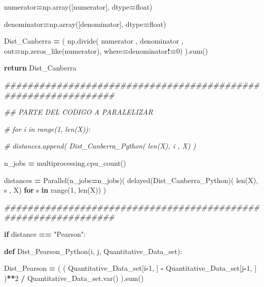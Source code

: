 \documentclass[
  11pt,
  a4paper,
]{article}
\newenvironment{Shaded}{\begin{snugshade}}{\end{snugshade}}
\newcommand{\BuiltInTok}[1]{#1}
\newcommand{\CommentTok}[1]{\textcolor[rgb]{0.56,0.35,0.01}{\textit{#1}}}
\newcommand{\ControlFlowTok}[1]{\textcolor[rgb]{0.13,0.29,0.53}{\textbf{#1}}}
\newcommand{\DecValTok}[1]{\textcolor[rgb]{0.00,0.00,0.81}{#1}}
\newcommand{\KeywordTok}[1]{\textcolor[rgb]{0.13,0.29,0.53}{\textbf{#1}}}
\newcommand{\NormalTok}[1]{#1}
\newcommand{\OperatorTok}[1]{\textcolor[rgb]{0.81,0.36,0.00}{\textbf{#1}}}
\newcommand{\StringTok}[1]{\textcolor[rgb]{0.31,0.60,0.02}{#1}}
\begin{document}
\begin{Shaded}
\begin{Highlighting}[]
\NormalTok{            numerator}\OperatorTok{=}\NormalTok{np.array([numerator], dtype}\OperatorTok{=}\BuiltInTok{float}\NormalTok{)}

\NormalTok{            denominator}\OperatorTok{=}\NormalTok{np.array([denominator], dtype}\OperatorTok{=}\BuiltInTok{float}\NormalTok{)}

\NormalTok{            Dist\_Canberra }\OperatorTok{=}\NormalTok{ ( np.divide( numerator , denominator , out}\OperatorTok{=}\NormalTok{np.zeros\_like(numerator), where}\OperatorTok{=}\NormalTok{denominator}\OperatorTok{!=}\DecValTok{0}\NormalTok{) ).}\BuiltInTok{sum}\NormalTok{()}

            \ControlFlowTok{return}\NormalTok{ Dist\_Canberra}

\CommentTok{\#\#\#\#\#\#\#\#\#\#\#\#\#\#\#\#\#\#\#\#\#\#\#\#\#\#\#\#\#\#\#\#\#\#\#\#\#\#\#\#\#\#\#\#\#\#\#\#\#\#\#\#\#\#\#\#\#\#\#\#\#\#\#}

        \CommentTok{\#\# PARTE DEL CODIGO A PARALELIZAR}

        \CommentTok{\# for i in range(1, len(X)):}

          \CommentTok{\#  distances.append( Dist\_Canberra\_Python( len(X), i , X) )}

\NormalTok{        n\_jobs  }\OperatorTok{=}\NormalTok{ multiprocessing.cpu\_count()}

\NormalTok{        distances }\OperatorTok{=}\NormalTok{ Parallel(n\_jobs}\OperatorTok{=}\NormalTok{n\_jobs)( delayed(Dist\_Canberra\_Python)( }\BuiltInTok{len}\NormalTok{(X), s , X) }\ControlFlowTok{for}\NormalTok{ s }\KeywordTok{in} \BuiltInTok{range}\NormalTok{(}\DecValTok{1}\NormalTok{, }\BuiltInTok{len}\NormalTok{(X)) )}
                

\CommentTok{\#\#\#\#\#\#\#\#\#\#\#\#\#\#\#\#\#\#\#\#\#\#\#\#\#\#\#\#\#\#\#\#\#\#\#\#\#\#\#\#\#\#\#\#\#\#\#\#\#\#\#\#\#\#\#\#\#\#\#\#\#\#\#}
   
    \ControlFlowTok{if}\NormalTok{ distance }\OperatorTok{==} \StringTok{"Pearson"}\NormalTok{:}

        \KeywordTok{def}\NormalTok{ Dist\_Pearson\_Python(i, j, Quantitative\_Data\_set):}

\NormalTok{            Dist\_Pearson }\OperatorTok{=}\NormalTok{ ( ( Quantitative\_Data\_set[i}\OperatorTok{{-}}\DecValTok{1}\NormalTok{, ] }\OperatorTok{{-}}\NormalTok{ Quantitative\_Data\_set[j}\OperatorTok{{-}}\DecValTok{1}\NormalTok{, ] )}\OperatorTok{**}\DecValTok{2} \OperatorTok{/}\NormalTok{ Quantitative\_Data\_set.var() ).}\BuiltInTok{sum}\NormalTok{()}


\end{Highlighting}
\end{Shaded}
\end{document}
